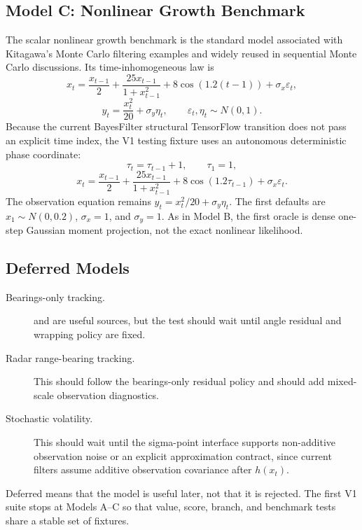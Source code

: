 \subsection{Model C: Nonlinear Growth Benchmark}
\label{subsec:bf-nonlinear-model-c}

The scalar nonlinear growth benchmark is the standard model associated with
Kitagawa's Monte Carlo filtering examples \citep{kitagawa1996montecarlo} and
widely reused in sequential Monte Carlo discussions.  Its time-inhomogeneous
law is
\[
  x_t=\frac{x_{t-1}}{2}
      +\frac{25x_{t-1}}{1+x_{t-1}^2}
      +8\cos(1.2(t-1))
      +\sigma_x\varepsilon_t,
\]
\[
  y_t=\frac{x_t^2}{20}+\sigma_y\eta_t,
  \qquad \varepsilon_t,\eta_t\sim N(0,1).
\]
Because the current BayesFilter structural TensorFlow transition does not pass
an explicit time index, the V1 testing fixture uses an autonomous deterministic
phase coordinate:
\[
  \tau_t=\tau_{t-1}+1,\qquad \tau_1=1,
\]
\[
  x_t=\frac{x_{t-1}}{2}
      +\frac{25x_{t-1}}{1+x_{t-1}^2}
      +8\cos(1.2\tau_{t-1})
      +\sigma_x\varepsilon_t.
\]
The observation equation remains \(y_t=x_t^2/20+\sigma_y\eta_t\).  The first
defaults are \(x_1\sim N(0,0.2)\), \(\sigma_x=1\), and \(\sigma_y=1\).
As in Model B, the first oracle is dense one-step Gaussian moment projection,
not the exact nonlinear likelihood.

\subsection{Deferred Models}
\label{subsec:bf-nonlinear-deferred-models}

\begin{description}
  \item[Bearings-only tracking.]
    \citet{gordon1993novel} and \citet{arulampalam2002tutorial} are useful
    sources, but the test should wait until angle residual and wrapping policy
    are fixed.
  \item[Radar range-bearing tracking.]
    This should follow the bearings-only residual policy and should add
    mixed-scale observation diagnostics.
  \item[Stochastic volatility.]
    This should wait until the sigma-point interface supports non-additive
    observation noise or an explicit approximation contract, since current
    filters assume additive observation covariance after \(h(x_t)\).
\end{description}

Deferred means that the model is useful later, not that it is rejected.  The
first V1 suite stops at Models A--C so that value, score, branch, and benchmark
tests share a stable set of fixtures.

